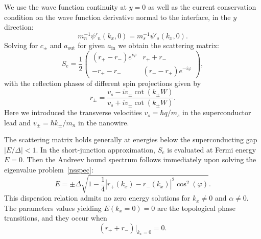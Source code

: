 \documentclass[twocolumn, notitlepage, 10pt, aps, floatfix, showpacs, prb, citeautoscript]{revtex4-1}
\newcommand{\pmat}[1]{\begin{pmatrix}#1\end{pmatrix}}
\begin{document}
We use the wave function continuity at $y=0$ as well as the current conservation condition on the wave function derivative normal to the interface, in the $y$ direction:
\begin{equation}\label{bc}
m_n^{-1}\psi'_n(k_x, 0) = m_s^{-1}\psi'_s(k_x, 0).
\end{equation}
Solving for $c_\pm$ and $a_\textrm{out}$ for given $a_\textrm{in}$ we obtain the scattering matrix:
\begin{equation}\label{trsscattmat}
S_e=\frac{1}{2}
\pmat{
(r_+-r_-)e^{i\varphi} & r_++r_- \\
-r_+-r_- & (r_--r_+)e^{-i\varphi}
},
\end{equation}
with the reflection phases of different spin projections given by
\begin{equation}\label{scattphase}
r_\pm=\frac{v_s-iv_\pm\cot(k_\pm W)}{v_s+iv_\pm\cot(k_\pm W)}.
\end{equation}
Here we introduced the transverse velocities $v_s=\hbar q/m_s$ in the superconductor lead and $v_\pm=\hbar k_\pm/m_n$ in the nanowire.

The scattering matrix holds generally at energies below the superconducting gap $|E/\Delta|<1$.
In the short-junction approximation, $S_e$ is evaluated at Fermi energy $E=0$.
Then the Andreev bound spectrum follows immediately upon solving the eigenvalue problem~\eqref{nsspec}:
\begin{equation}\label{andreev}
E=\pm\Delta\sqrt{1-\frac{1}{4}|r_+(k_x)-r_-(k_x)|^2\cos^2(\varphi)}.
\end{equation}
This dispersion relation admits no zero energy solutions for $k_x\ne 0$ and $\alpha \ne 0$.
The parameters values yielding $E(k_x=0) = 0$ are the topological phase transitions, and they occur when
\begin{equation}\label{toptrans}
(r_++r_-)|_{k_x=0}=0.
\end{equation}
\end{document}
